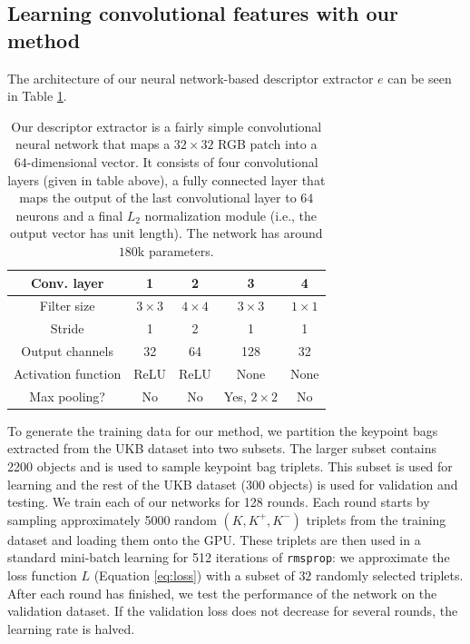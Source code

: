 \documentclass[twocolumn]{article}
\begin{document}
		\subsection{Learning convolutional features with our method}
			The architecture of our neural network-based descriptor extractor $e$ can be seen in Table \ref{tbl:nn}.
			\begin{table}
				\resizebox{\columnwidth}{!}
				{
				\begin{tabular}{|c||c|c|c|c|}
					\hline
					Conv. layer	&	1	&	2	&	3	&	4	\\
					\hline
					\hline
					Filter size	&	$3\times 3$	&	$4\times 4$	&	$3\times 3$	&	$1\times 1$	\\
					\hline
					Stride	&	1	&	2	&	1	&	1	\\
					\hline
					Output channels	&	32	&	64	&	128	&	32	\\
					\hline
					Activation function	&	ReLU	&	ReLU	&	None	&	None	\\
					\hline
					Max pooling?	& No	&	No	&	Yes, $2\times2$	&	No	\\
					\hline
				\end{tabular}
				}
				\caption
				{
					Our descriptor extractor is a fairly simple convolutional neural network that maps a $32\times 32$ RGB patch into a $64$-dimensional vector.
					It consists of four convolutional layers (given in table above), a fully connected layer that maps the output of the last convolutional layer to $64$ neurons and a final $L_2$ normalization module (i.e., the output vector has unit length).
					The network has around $180$k parameters.
				}
				\label{tbl:nn}
			\end{table}
			To generate the training data for our method, we partition the keypoint bags extracted from the UKB dataset into two subsets.
			The larger subset contains 2200 objects and is used to sample keypoint bag triplets.
			This subset is used for learning and the rest of the UKB dataset (300 objects) is used for validation and testing.
			We train each of our networks for 128 rounds.
			Each round starts by sampling approximately 5000 random $(K, K^+, K^-)$ triplets from the training dataset and loading them onto the GPU.
			These triplets are then used in a standard mini-batch learning for 512 iterations of \texttt{rmsprop}:
			we approximate the loss function $L$ (Equation \eqref{eq:loss}) with a subset of $32$ randomly selected triplets.
			After each round has finished, we test the performance of the network on the validation dataset.
			If the validation loss does not decrease for several rounds, the learning rate is halved.
\end{document}
